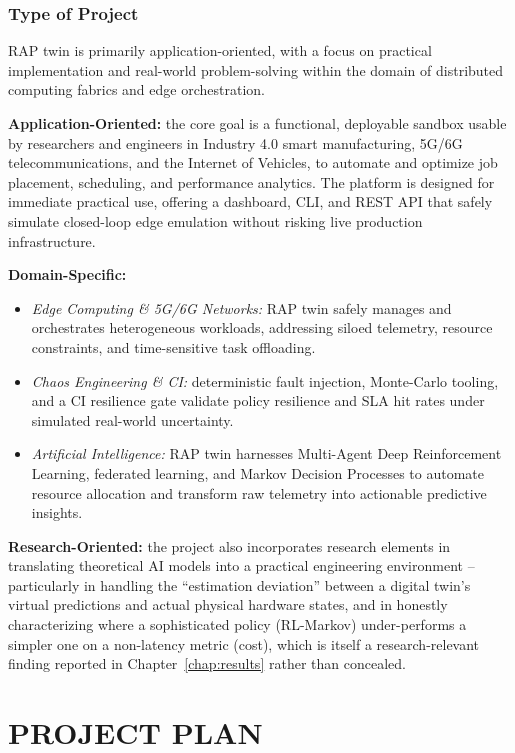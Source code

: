 \documentclass[12pt,a4]{report}
\begin{document}
\subsection{Type of Project}

RAP twin is primarily application-oriented, with a focus on practical implementation and real-world problem-solving within the domain of distributed computing fabrics and edge orchestration.

\textbf{Application-Oriented:} the core goal is a functional, deployable sandbox usable by researchers and engineers in Industry 4.0 smart manufacturing, 5G/6G telecommunications, and the Internet of Vehicles, to automate and optimize job placement, scheduling, and performance analytics. The platform is designed for immediate practical use, offering a dashboard, CLI, and REST API that safely simulate closed-loop edge emulation without risking live production infrastructure.

\textbf{Domain-Specific:}
\begin{itemize}
    \item \textit{Edge Computing \& 5G/6G Networks:} RAP twin safely manages and orchestrates heterogeneous workloads, addressing siloed telemetry, resource constraints, and time-sensitive task offloading.
    \item \textit{Chaos Engineering \& CI:} deterministic fault injection, Monte-Carlo tooling, and a CI resilience gate validate policy resilience and SLA hit rates under simulated real-world uncertainty.
    \item \textit{Artificial Intelligence:} RAP twin harnesses Multi-Agent Deep Reinforcement Learning, federated learning, and Markov Decision Processes to automate resource allocation and transform raw telemetry into actionable predictive insights.
\end{itemize}

\textbf{Research-Oriented:} the project also incorporates research elements in translating theoretical AI models into a practical engineering environment -- particularly in handling the ``estimation deviation'' between a digital twin's virtual predictions and actual physical hardware states, and in honestly characterizing where a sophisticated policy (RL-Markov) under-performs a simpler one on a non-latency metric (cost), which is itself a research-relevant finding reported in Chapter~\ref{chap:results} rather than concealed.



\chapter{PROJECT PLAN}
\end{document}
